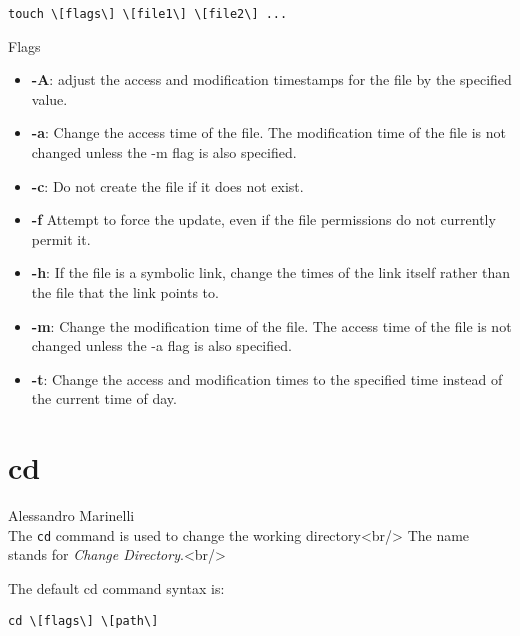 \documentclass[hidelinks,12pt,a4paper,numbers=enddot]{scrartcl}
\begin{document}
\begin{verbatim}
touch \[flags\] \[file1\] \[file2\] ...
\end{verbatim}

Flags

\begin{itemize}
    \item \textbf{-A}: adjust the access and modification timestamps for the file by the
        specified value.
    
    \item \textbf{-a}: Change the access time of the file. The modification time of the
        file is not changed unless the -m flag is also specified.
    
    \item \textbf{-c}: Do not create the file if it does not exist.
    \item \textbf{-f} Attempt to force the update, even if the file permissions do not
        currently permit it.
    
    \item \textbf{-h}: If the file is a symbolic link, change the times of the link
        itself rather than the file that the link points to.
    
     \item \textbf{-m}: Change the modification time of the file. The access time of the
        file is not changed unless the -a flag is also specified.
    
    \item \textbf{-t}: Change the access and modification times to the specified time
        instead of the current time of day.
    
\end{itemize}

\section{cd}


\large Alessandro Marinelli \normalsize\\







The \texttt{cd} command is used to change the working directory<br/>
The name stands for \emph{Change Directory}.<br/>

The default cd command syntax is:


\begin{verbatim}
cd \[flags\] \[path\]
\end{verbatim}
\end{document}

